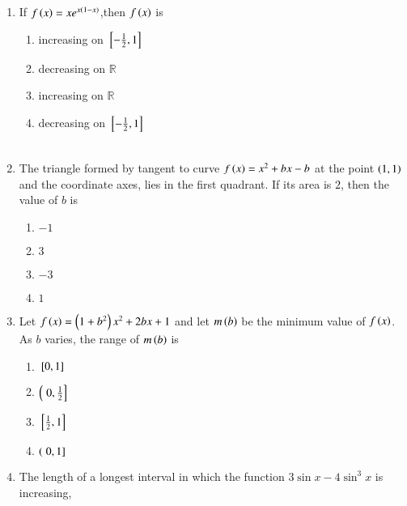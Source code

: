 \documentclass[journal]{IEEEtran}
\begin{document}
\begin{enumerate}[start=9]
\begin{enumerate}
\end{enumerate}
\item If $f\left(x\right)=xe^{x\left(1-x\right)}$,then $f\left(x\right)$ is 
\hfill {}
\begin{enumerate}
    \item increasing on ${}\left[-\frac{1}{2},1\right]$\\
    \item decreasing on $\mathbb{R}$
    \item increasing on $\mathbb{R}$
    \item decreasing on ${}\left[-\frac{1}{2},1\right]$\\\\
\end{enumerate}

\item The triangle formed by tangent to curve $f\left(x\right)=x^2+bx-b$ at the point $\left(1,1\right)$ and the coordinate axes, lies in the first quadrant. If its area is $2$, then the value of $b$ is 
\hfill {}
\begin{multicols}{4}
\begin{enumerate}
    \item $-1$
    \item $3$
    \item $-3$
    \item $1$\\
\end{enumerate}
\end{multicols}
\item Let $f\left(x\right)=\left(1+b^2\right)x^2+2bx+1$ and let $m\left(b\right)$ be the minimum value of $f\left(x\right)$. As $b$ varies, the range of $m\left(b\right)$ is 
\hfill {}
\begin{multicols}{4}
\begin{enumerate}
    \item ${}\left[0,1\right]$\\
    \item $\left({}\left.0,\frac{1}{2}\right]\right.$\\
    \item ${}\left[\frac{1}{2},1\right]$\\
    \item $\left({}\left.0,1\right]\right.$\\
\end{enumerate}
\end{multicols}
\item The length of a longest interval in which the function $3 \sin x-4\sin^3x$ is increasing,\\

\end{enumerate}
\end{document}
